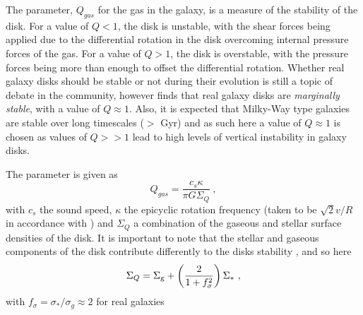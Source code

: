 The \citet{toomre1964} parameter, $Q_{gas}$ for the gas in the galaxy, is a measure of the stability of the disk.
For a value of $Q<1$, the disk is unstable, with the shear forces being applied due to the differential rotation in the disk overcoming internal pressure forces of the gas.
For a value of $Q>1$, the disk is overstable, with the pressure forces being more than enough to offset the differential rotation.
Whether real galaxy disks should be stable or not during their evolution is still a topic of debate in the community, however \citet{SOMEBODY} finds that real galaxy disks are \emph{marginally stable}, with a value of $Q \approx 1$.
Also, it is expected that Milky-Way type galaxies are stable over long timescales ($>$ Gyr) and as such here a value of $Q \approx 1$ is chosen as values of $Q >> 1$ lead to high levels of vertical instability in galaxy disks.

The \citet{toomre1964} parameter is given as
\begin{equation}
    Q_{gas} = \frac{c_s \kappa}{\pi G \Sigma_Q}~,
    \label{eqn:Q}
\end{equation}
with $c_s$ the sound speed, $\kappa$ the epicyclic rotation frequency (taken to be $\sqrt{2} v/R$ in accordance with \citet{WHOEVER}) and $\Sigma_Q$ a combination of the gaseous and stellar surface densities of the disk.
It is important to note that the stellar and gaseous components of the disk contribute differently to the disks stability \citep{rafikov2001}, and so here
\begin{equation}
    \Sigma_Q = \Sigma_\mathrm{g}  + \left(\frac{2}{1 + f_\sigma^2}\right)\Sigma_*~,
    \label{eqn:sgq}
\end{equation}
with $f_\sigma = \sigma_*/\sigma_g \approx 2$ for real galaxies \citep{korchagin2003}
    
